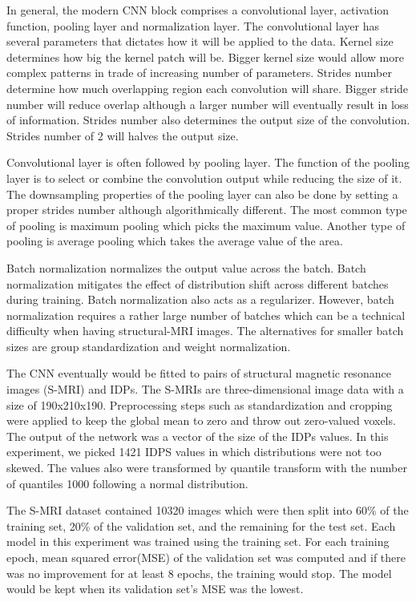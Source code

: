 \documentclass{article}
\begin{document}
    In general, the modern CNN block comprises a convolutional layer, activation function, pooling layer and normalization layer. 
    The convolutional layer has several parameters that dictates how it will be applied to the data. 
    Kernel size determines how big the kernel patch will be. 
    Bigger kernel size would allow more complex patterns in trade of increasing number of parameters. 
    Strides number determine how much overlapping region each convolution will share. 
    Bigger stride number will reduce overlap although a larger number will eventually result in loss of information. 
    Strides number also determines the output size of the convolution. 
    Strides number of 2 will halves the output size.

    Convolutional layer is often followed by pooling layer. 
    The function of the pooling layer is to select or combine the convolution output while reducing the size of it. 
    The downsampling properties of the pooling layer can also be done by setting a proper strides number although algorithmically different. 
    The most common type of pooling is maximum pooling which picks the maximum value. 
    Another type of pooling is average pooling which takes the average value of the area. 

    Batch normalization normalizes the output value across the batch. 
    Batch normalization mitigates the effect of distribution shift across different batches during training. 
    Batch normalization also acts as a regularizer. 
    However, batch normalization requires a rather large number of batches which can be a technical difficulty when having structural-MRI images. 
    The alternatives for smaller batch sizes are group standardization and weight normalization.

    The CNN eventually would be fitted to pairs of structural magnetic resonance images (S-MRI) and IDPs. 
    The S-MRIs are three-dimensional image data with a size of 190x210x190. 
    Preprocessing steps such as standardization and cropping were applied to keep the global mean to zero and throw out zero-valued voxels. 
    The output of the network was a vector of the size of the IDPs values. 
    In this experiment, we picked 1421 IDPS values in which distributions were not too skewed. 
    The values also were transformed by quantile transform with the number of quantiles 1000 following a normal distribution. 

    The S-MRI dataset contained 10320 images which were then split into 60\% of the training set, 20\% of the validation set, and the remaining for the test set. 
    Each model in this experiment was trained using the training set. 
    For each training epoch, mean squared error(MSE) of the validation set was computed and if there was no improvement for at least 8 epochs, the training would stop. 
    The model would be kept when its validation set’s MSE was the lowest.
\end{document}
